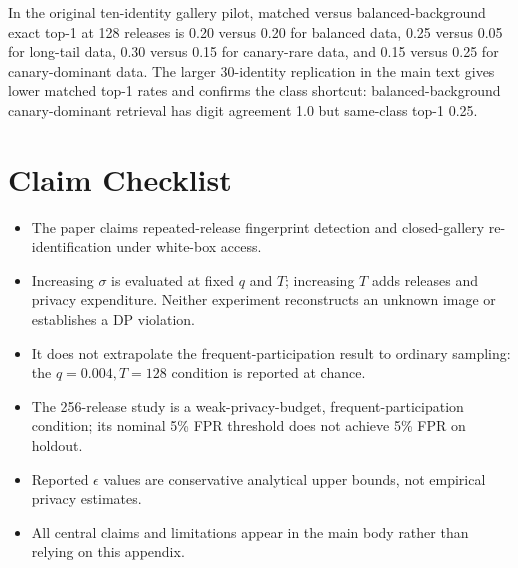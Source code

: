 \documentclass[conference]{IEEEtran}
\begin{document}
In the original ten-identity gallery pilot, matched versus balanced-background exact top-1 at 128 releases is 0.20 versus 0.20 for balanced data, 0.25 versus 0.05 for long-tail data, 0.30 versus 0.15 for canary-rare data, and 0.15 versus 0.25 for canary-dominant data. The larger 30-identity replication in the main text gives lower matched top-1 rates and confirms the class shortcut: balanced-background canary-dominant retrieval has digit agreement 1.0 but same-class top-1 0.25.

\section{Claim Checklist}

\begin{itemize}
  \item The paper claims repeated-release fingerprint detection and closed-gallery re-identification under white-box access.
  \item Increasing $\sigma$ is evaluated at fixed $q$ and $T$; increasing $T$ adds releases and privacy expenditure. Neither experiment reconstructs an unknown image or establishes a DP violation.
  \item It does not extrapolate the frequent-participation result to ordinary sampling: the $q=0.004,T=128$ condition is reported at chance.
  \item The 256-release study is a weak-privacy-budget, frequent-participation condition; its nominal 5\% FPR threshold does not achieve 5\% FPR on holdout.
  \item Reported $\epsilon$ values are conservative analytical upper bounds, not empirical privacy estimates.
  \item All central claims and limitations appear in the main body rather than relying on this appendix.
\end{itemize}
\end{document}
